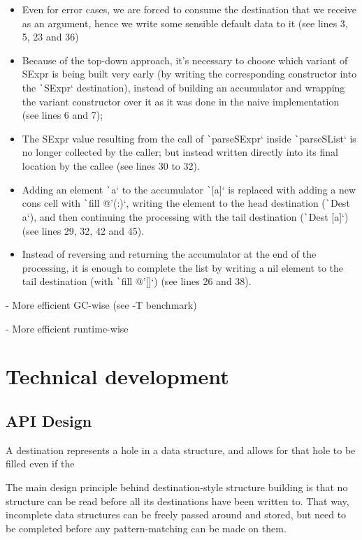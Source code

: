\documentclass[english]{jflart}
\begin{document}
\begin{itemize}
  \item Even for error cases, we are forced to consume the destination that we receive as an argument, hence we write some sensible default data to it (see lines 3, 5, 23 and 36)
  \item Because of the top-down approach, it's necessary to choose which variant of SExpr is being built very early (by writing the corresponding constructor into the \texttt`SExpr` destination), instead of building an accumulator and wrapping the variant constructor over it as it was done in the naive implementation (see lines 6 and 7);
  \item The SExpr value resulting from the call of \texttt`parseSExpr` inside \texttt`parseSList` is no longer collected by the caller; but instead written directly into its final location by the callee (see lines 30 to 32).
  \item Adding an element \texttt`a` to the accumulator \texttt`[a]` is replaced with adding a new cons cell with \texttt`fill @'(:)`, writing the element to the head destination (\texttt`Dest a`), and then continuing the processing with the tail destination (\texttt`Dest [a]`) (see lines 29, 32, 42 and 45).
  \item Instead of reversing and returning the accumulator at the end of the processing, it is enough to complete the list by writing a nil element to the tail destination (with \texttt`fill @'[]`) (see lines 26 and 38).
\end{itemize}

- More efficient GC-wise (see -T benchmark)

- More efficient runtime-wise

\section{Technical development}

\subsection{API Design}

A destination represents a hole in a data structure, and allows for that hole to be filled even if the 

The main design principle behind destination-style structure building is that no structure can be read before all its destinations have been written to. That way, incomplete data structures can be freely passed around and stored, but need to be completed before any pattern-matching can be made on them.
\end{document}
